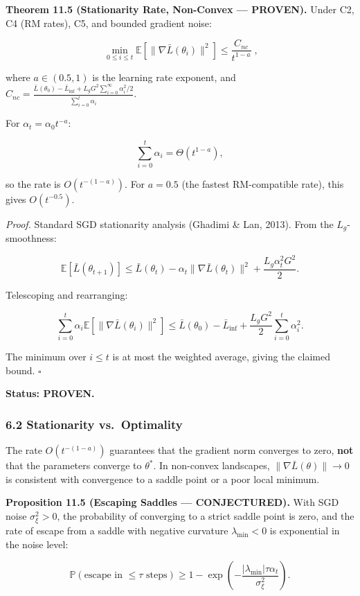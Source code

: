 \documentclass[
  12pt,
]{article}
\begin{document}
\textbf{Theorem 11.5 (Stationarity Rate, Non-Convex --- PROVEN).} Under
C2, C4 (RM rates), C5, and bounded gradient noise:

\[\boxed{\;\min_{0 \leq i \leq t} \mathbb{E}[\|\nabla \bar{L}(\theta_i)\|^2] \leq \frac{C_{nc}}{t^{1-a}}\;},\]

where \(a \in (0.5, 1)\) is the learning rate exponent, and
\(C_{nc} = \frac{\bar{L}(\theta_0) - \bar{L}_{\inf} + L_g G^2 \sum_{i=0}^\infty \alpha_i^2 / 2}{\sum_{i=0}^t \alpha_i}\).

For \(\alpha_t = \alpha_0 t^{-a}\):

\[\sum_{i=0}^t \alpha_i = \Theta(t^{1-a}),\]

so the rate is \(O(t^{-(1-a)})\). For \(a = 0.5\) (the fastest
RM-compatible rate), this gives \(O(t^{-0.5})\).

\emph{Proof.} Standard SGD stationarity analysis (Ghadimi \& Lan, 2013).
From the \(L_g\)-smoothness:

\[\mathbb{E}[\bar{L}(\theta_{t+1})] \leq \bar{L}(\theta_t) - \alpha_t \|\nabla \bar{L}(\theta_t)\|^2 + \frac{L_g \alpha_t^2 G^2}{2}.\]

Telescoping and rearranging:

\[\sum_{i=0}^t \alpha_i \mathbb{E}[\|\nabla \bar{L}(\theta_i)\|^2] \leq \bar{L}(\theta_0) - \bar{L}_{\inf} + \frac{L_g G^2}{2} \sum_{i=0}^t \alpha_i^2.\]

The minimum over \(i \leq t\) is at most the weighted average, giving
the claimed bound. \(\square\)

\textbf{Status: PROVEN.}

\subsubsection{6.2 Stationarity
vs.~Optimality}\label{stationarity-vs.-optimality}

The rate \(O(t^{-(1-a)})\) guarantees that the gradient norm converges
to zero, \textbf{not} that the parameters converge to \(\theta^*\). In
non-convex landscapes, \(\|\nabla \bar{L}(\theta)\| \to 0\) is
consistent with convergence to a saddle point or a poor local minimum.

\textbf{Proposition 11.5 (Escaping Saddles --- CONJECTURED).} With SGD
noise \(\sigma_\xi^2 > 0\), the probability of converging to a strict
saddle point is zero, and the rate of escape from a saddle with negative
curvature \(\lambda_{\min} < 0\) is exponential in the noise level:

\[\mathbb{P}(\text{escape in } \leq \tau \text{ steps}) \geq 1 - \exp\!\left(-\frac{|\lambda_{\min}| \tau \alpha_t}{\sigma_\xi^2}\right).\]
\end{document}
